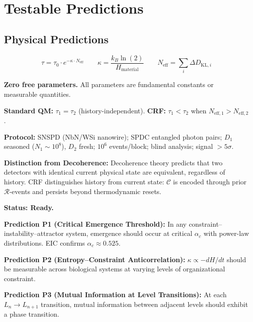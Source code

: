 \documentclass[12pt, a4paper]{article}
\begin{document}
\section{Testable Predictions}

\subsection{Physical Predictions}

\begin{keybox}[title={Prediction P0: Wave Function Collapse Depends on Detector History}]
\[
  \tau = \tau_0\cdot e^{-\kappa\cdot N_{\mathrm{eff}}}
  \qquad
  \kappa = \frac{k_B\ln(2)}{H_{\mathrm{material}}}
  \qquad
  N_{\mathrm{eff}} = \sum_i \Delta D_{\mathrm{KL},i}
\]

\textbf{Zero free parameters.} All parameters are fundamental constants or measurable quantities.

\textbf{Standard QM:} $\tau_1 = \tau_2$ (history-independent). \textbf{CRF:} $\tau_1 < \tau_2$
when $N_{\mathrm{eff},1} > N_{\mathrm{eff},2}$.

\textbf{Protocol:} SNSPD (NbN/WSi nanowire); SPDC entangled photon pairs; $D_1$ seasoned
($N_1 \sim 10^8$), $D_2$ fresh; $10^6$ events/block; blind analysis; signal $> 5\sigma$.

\textbf{Distinction from Decoherence:} Decoherence theory predicts that two detectors with
identical current physical state are equivalent, regardless of history. CRF distinguishes history
from current state: $\mathcal{C}$ is encoded through prior $\mathcal{R}$-events and persists
beyond thermodynamic resets.

\textbf{Status: Ready.}
\end{keybox}

\textbf{Prediction P1 (Critical Emergence Threshold):} In any constraint--instability--attractor
system, emergence should occur at critical $\alpha_c$ with power-law distributions. EIC confirms
$\alpha_c \approx 0.525$.

\textbf{Prediction P2 (Entropy--Constraint Anticorrelation):} $\kappa \propto -dH/dt$ should be
measurable across biological systems at varying levels of organizational constraint.

\textbf{Prediction P3 (Mutual Information at Level Transitions):} At each $L_n \to L_{n+1}$
transition, mutual information between adjacent levels should exhibit a phase transition.
\end{document}
